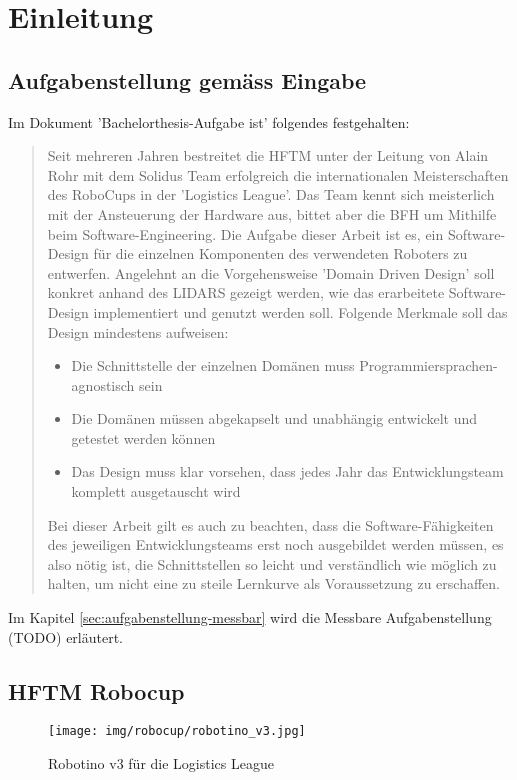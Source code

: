 \chapter{Einleitung}
\section{Aufgabenstellung gemäss Eingabe}
Im Dokument 'Bachelorthesis-Aufgabe ist' folgendes festgehalten:
\begin{quote}
Seit mehreren Jahren bestreitet die HFTM unter der Leitung von Alain Rohr mit dem Solidus Team erfolgreich die internationalen Meisterschaften des RoboCups in der 'Logistics League'.
Das Team kennt sich meisterlich mit der Ansteuerung der Hardware aus, bittet aber die BFH um Mithilfe beim Software-Engineering.
Die Aufgabe dieser Arbeit ist es, ein Software-Design für die einzelnen Komponenten des verwendeten Roboters zu entwerfen. Angelehnt an die Vorgehensweise 'Domain Driven Design' soll konkret anhand des LIDARS gezeigt werden, wie das erarbeitete Software-Design implementiert und genutzt werden soll. Folgende Merkmale soll das Design mindestens aufweisen:

\begin{itemize}
	\item Die Schnittstelle der einzelnen Domänen muss Programmiersprachen-agnostisch sein
	\item Die Domänen müssen abgekapselt und unabhängig entwickelt und getestet werden können
	\item Das Design muss klar vorsehen, dass jedes Jahr das Entwicklungsteam komplett ausgetauscht wird
\end{itemize}
Bei dieser Arbeit gilt es auch zu beachten, dass die Software-Fähigkeiten des jeweiligen Entwicklungsteams erst noch ausgebildet werden müssen, es also nötig ist, die Schnittstellen so leicht und verständlich wie möglich zu halten, um nicht eine zu steile Lernkurve als Voraussetzung zu erschaffen.
\end{quote}
Im Kapitel \ref{sec:aufgabenstellung-messbar} wird die Messbare Aufgabenstellung (TODO) erläutert.

\section{HFTM Robocup}
\begin{figure}[H]
	\centering
	\texttt{[image: img/robocup/robotino\_v3.jpg]}
	\caption{Robotino v3 für die Logistics League\cite{robotino}}
	\label{fig:robotino}
\end{figure}

